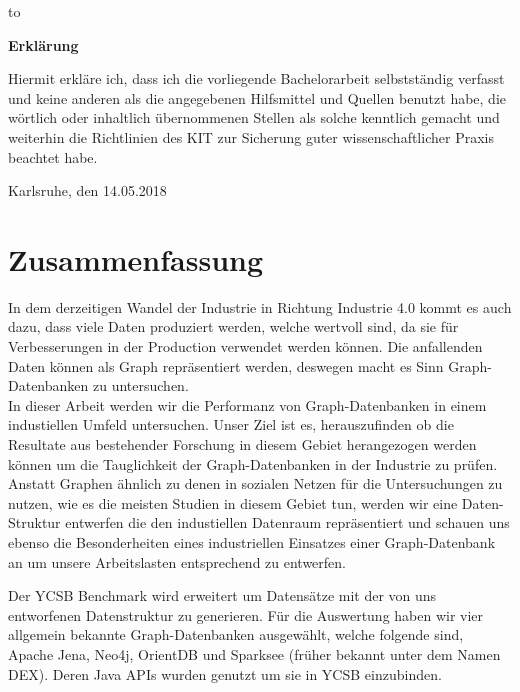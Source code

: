 \thispagestyle{empty}
\vspace*{37\baselineskip}
\hbox to \textwidth{\hrulefill}
\par
\textbf{Erklärung}

Hiermit erkl\"are ich,
dass ich die vorliegende Bachelorarbeit selbstst\"andig verfasst und keine anderen als die angegebenen Hilfsmittel und Quellen benutzt habe,
die w\"ortlich oder inhaltlich \"ubernommenen Stellen als solche kenntlich gemacht und weiterhin die Richtlinien des KIT zur Sicherung guter wissenschaftlicher Praxis beachtet habe.

Karlsruhe, den 14.05.2018

\cleardoublepage


\chapter*{Zusammenfassung}

In dem derzeitigen Wandel der Industrie in Richtung Industrie 4.0 kommt es auch dazu,
dass viele Daten produziert werden,
welche wertvoll sind,
da sie für Verbesserungen in der Production verwendet werden können.
Die anfallenden Daten können als Graph repräsentiert werden,
deswegen macht es Sinn Graph-Datenbanken zu untersuchen.\\
In dieser Arbeit werden wir die Performanz von Graph-Datenbanken in einem industiellen Umfeld untersuchen.
Unser Ziel ist es,
herauszufinden ob die Resultate aus bestehender Forschung in diesem Gebiet herangezogen werden können um die Tauglichkeit der Graph-Datenbanken in der Industrie zu prüfen.
Anstatt Graphen ähnlich zu denen in sozialen Netzen für die Untersuchungen zu nutzen,
wie es die meisten Studien in diesem Gebiet tun,
werden wir eine Daten-Struktur entwerfen die den industiellen Datenraum repräsentiert und schauen uns ebenso die Besonderheiten eines industriellen Einsatzes einer Graph-Datenbank an um unsere Arbeitslasten entsprechend zu entwerfen.

Der YCSB Benchmark wird erweitert um Datensätze mit der von uns entworfenen Datenstruktur zu generieren.
Für die Auswertung haben wir vier allgemein bekannte Graph-Datenbanken ausgewählt,
welche folgende sind, Apache Jena, Neo4j, OrientDB und Sparksee (früher bekannt unter dem Namen DEX).
Deren Java APIs wurden genutzt um sie in YCSB einzubinden.

